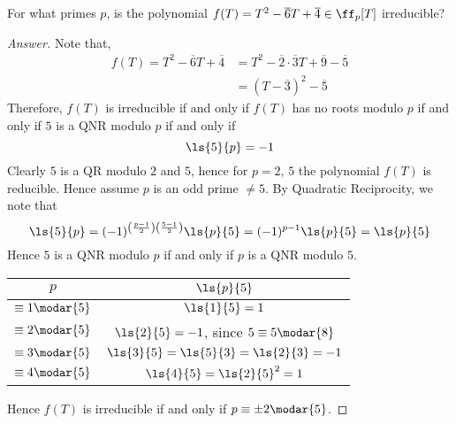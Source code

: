 \vspace*{1em}

\begin{example}
For what primes $p$, is the polynomial $f(T) = T^2 - \overline{6}T + \overline{4} \in \ff_p[T]$ irreducible?
\end{example}
\begin{proof}[Answer]
Note that,
\begin{align*}
f(T) = T^2 - \overline{6}T + \overline{4} &= T^2 - \overline{2}\cdot\overline{3}T + \overline{9} - \overline{5}\\[0.5em]
&= (T - \overline{3})^2 - \overline{5}
\end{align*}
Therefore, $f(T)$ is irreducible if and only if $f(T)$ has no roots modulo $p$ if and only if $5$ is a QNR modulo $p$ if and only if
\[\ls{5}{p} = -1\]
Clearly $5$ is a QR modulo $2$ and $5$, hence for $p = 2,\,5$ the polynomial $f(T)$ is reducible. Hence assume $p$ is an odd prime $\neq 5$.
By Quadratic Reciprocity, we note that
\[\ls{5}{p} = (-1)^{\left(\frac{p-1}{2}\right)\left(\frac{5-1}{2}\right)}\ls{p}{5} = (-1)^{p-1}\ls{p}{5} = \ls{p}{5}\]
Hence $5$ is a QNR modulo $p$ if and only if $p$ is a QNR modulo $5$.
\begin{center}
{\renewcommand{\arraystretch}{2}%
\begin{tabular}{|c|c|}
\hline
$p$ & $\ls{p}{5}$\\[0.5em]
\hline
$\equiv 1\modar{5}$ & $\ls{1}{5} = 1$\\
\hline
$\equiv 2 \modar{5}$ & $\ls{2}{5} = -1$, since $5 \equiv 5 \modar{8}$ \\
\hline
$\equiv 3 \modar{5}$ & $\ls{3}{5} = \ls{5}{3} = \ls{2}{3} = -1$\\
\hline
$\equiv 4 \modar{5}$ & $\ls{4}{5} = \ls{2}{5}^2 = 1$ \\
\hline
\end{tabular}}
\end{center}
Hence $f(T)$ is irreducible if and only if $p \equiv \pm 2 \modar{5}$.
\end{proof}